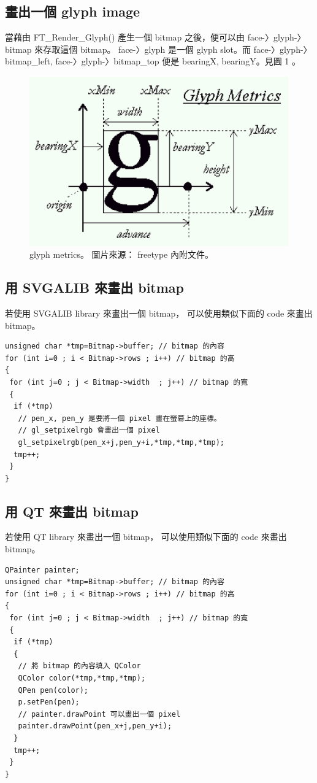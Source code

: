 \documentclass[12pt,a4]{article}
\begin{document}
\begin{CJK}{UTF8}{bsmi}
\section{畫出一個 glyph image}
當藉由 FT\_{}Render\_{}Glyph() 產生一個 bitmap 之後，便可以由 face-〉glyph-〉bitmap
來存取這個 bitmap。 face-〉glyph 是一個 glyph slot。而 face-〉glyph-〉bitmap\_{}left,
face-〉glyph-〉bitmap\_{}top 便是 bearingX, bearingY。見圖 1 。
\begin{figure}
\caption{glyph metrics。 圖片來源： freetype 內附文件。}
\begin{center}
\includegraphics[scale=0.7]{metrics.eps}
\end{center}
\end{figure}
\subsection{用 SVGALIB 來畫出 bitmap}
若使用 SVGALIB library 來畫出一個 bitmap， 可以使用類似下面的 code 來畫出 bitmap。
\begin{Verbatim}[commandchars=@\[\]]
unsigned char *tmp=Bitmap->buffer; // bitmap 的內容
for (int i=0 ; i < Bitmap->rows ; i++) // bitmap 的高
{
 for (int j=0 ; j < Bitmap->width  ; j++) // bitmap 的寬
 {
  if (*tmp)
   // pen_x, pen_y 是要將一個 pixel 畫在螢幕上的座標。
   // gl_setpixelrgb 會畫出一個 pixel
   gl_setpixelrgb(pen_x+j,pen_y+i,*tmp,*tmp,*tmp);
  tmp++;
 }
}
\end{Verbatim}

\subsection{用 QT 來畫出 bitmap}
若使用 QT library 來畫出一個 bitmap， 可以使用類似下面的 code 來畫出 bitmap。
\begin{Verbatim}[commandchars=@\[\]]
QPainter painter;
unsigned char *tmp=Bitmap->buffer; // bitmap 的內容
for (int i=0 ; i < Bitmap->rows ; i++) // bitmap 的高
{
 for (int j=0 ; j < Bitmap->width  ; j++) // bitmap 的寬
 {
  if (*tmp)
  {
   // 將 bitmap 的內容填入 QColor
   QColor color(*tmp,*tmp,*tmp);
   QPen pen(color);
   p.setPen(pen);
   // painter.drawPoint 可以畫出一個 pixel
   painter.drawPoint(pen_x+j,pen_y+i);
  }
  tmp++;
 }
}
\end{Verbatim}
\newpage

\end{CJK}
\end{document}
